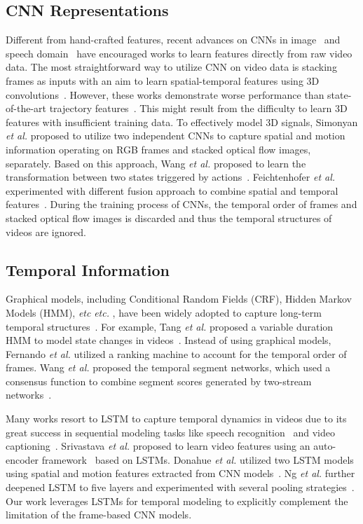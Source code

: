 \documentclass[journal]{IEEEtran}
\makeatletter
\newcommand*{\etal}{\emph{et al.}\@\xspace}
\newcommand*{\etc}{%
    \@ifnextchar{.}%
        {\emph{etc}}%
        {\emph{etc.}\@\xspace}%
}
\makeatother
\begin{document}
\subsection{CNN Representations}
Different from hand-crafted features, recent advances on CNNs in image~\cite{krizhevsky2012imagenet,girshick2014rcnn} and speech domain~\cite{DBLP:conf/icassp/GravesMH13} have encouraged works to learn features directly from raw video data. The most straightforward way to utilize CNN on video data is stacking frames as inputs with an aim to learn spatial-temporal features using 3D convolutions~\cite{DBLP:conf/icml/JiXYY10,KarpathyCVPR14,Tran2015}. However, these works demonstrate worse performance than state-of-the-art trajectory features~\cite{wang2013action}. This might result from the difficulty to learn 3D features with insufficient training data. To effectively model 3D signals, Simonyan \etal proposed to utilize two independent CNNs to capture spatial and motion information operating on RGB frames and stacked optical flow images, separately. Based on this approach, Wang \etal proposed to learn the transformation between two states triggered by actions~\cite{Wang2016}. Feichtenhofer \etal experimented with different fusion approach to combine spatial and temporal features~\cite{Feichtenhofer2016}. During the training process of CNNs, the temporal order of frames and stacked optical flow images is discarded and thus the temporal structures of videos are ignored.

\subsection{Temporal Information}
Graphical models, including Conditional Random Fields (CRF), Hidden Markov Models (HMM), \etc, have been widely adopted to capture long-term temporal structures~\cite{vail2007conditional,wang2009max,tang2012learning}. For example, Tang \etal proposed a variable duration HMM to model state changes in videos~\cite{tang2012learning}. Instead of using graphical models, Fernando \etal utilized a ranking machine to account for the temporal order of frames. Wang \etal proposed the temporal segment networks, which used a consensus function to combine segment scores generated by two-stream networks~\cite{Wang2016a}. 

Many works resort to LSTM to capture temporal dynamics in videos due to its great success in sequential modeling tasks like speech recognition~\cite{DBLP:conf/icassp/GravesMH13} and video captioning~\cite{Sutskever:2014ty}. Srivastava \etal proposed to learn video features using an auto-encoder framework~\cite{Srivastava2015} based on LSTMs. Donahue \etal utilized two LSTM models using spatial and motion features extracted from CNN models~\cite{Donahue2015}. Ng \etal further deepened LSTM to five layers and experimented with several pooling strategies~\cite{Ng2015}. Our work leverages LSTMs for temporal modeling to explicitly complement the limitation of the frame-based CNN models.
\end{document}
